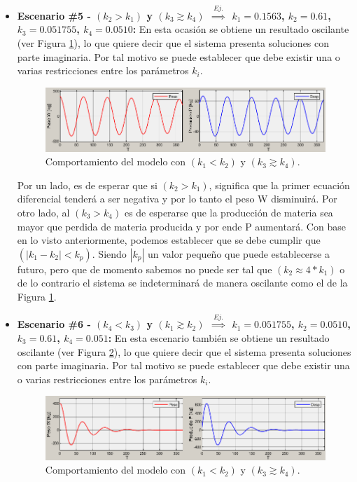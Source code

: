 \begin{itemize}
    \pagebreak
    \item \textbf{Escenario \#5 - $(k_{2} > k_{1})$ y $(k_{3}\gtrsim k_{4})$ $\overset{Ej.}{\implies}$ $k_{1}=0.1563$, $k_{2}=0.61$, $k_{3}=0.051755$, $k_{4}=0.0510$:} En esta ocasión se obtiene un resultado oscilante (ver Figura \ref{k2Mk1_k3MAPk4png}), lo que quiere decir que el sistema presenta soluciones con parte imaginaria. Por tal motivo se puede establecer que debe existir una o varias restricciones entre los parámetros $k_{i}$.
    
        \begin{figure}[H]
            \centering
            \includegraphics[scale=0.75]{img/k2Mk1_k3MAPk4.png}
            \caption{Comportamiento del modelo con $(k_{1}< k_{2})$ y $(k_{3}\gtrsim k_{4})$. \label{k2Mk1_k3MAPk4png}}
        \end{figure}
    
    Por un lado, es de esperar que si $(k_{2} > k_{1})$, significa que la primer ecuación diferencial tenderá a ser negativa y por lo tanto el peso W disminuirá. Por otro lado, al $(k_{3} > k_{4})$ es de esperarse que la producción de materia sea mayor que perdida de materia producida y por ende P aumentará. Con base en lo visto anteriormente, podemos establecer que se debe cumplir que $(|k_{1} - k_{2}| < k_{p})$. Siendo $|k_{p}|$ un valor pequeño que puede establecerse a futuro, pero que de momento sabemos no puede ser tal que $(k_{2} \approx 4*k_{1})$ o de lo contrario el sistema se indeterminará de manera oscilante como el de la Figura \ref{k2Mk1_k3MAPk4png}.
        
    \item \textbf{Escenario \#6 - $(k_{4}< k_{3})$ y $(k_{1}\gtrsim k_{2})$ $\overset{Ej.}{\implies}$ $k_{1}=0.051755$, $k_{2}=0.0510$, $k_{3}=0.61$, $k_{4}=0.051$:} En esta escenario también se obtiene un resultado oscilante (ver Figura \ref{k3Mk4_k1MAPk2png}), lo que quiere decir que el sistema presenta soluciones con parte imaginaria. Por tal motivo se puede establecer que debe existir una o varias restricciones entre los parámetros $k_{i}$.\\

        \begin{figure}[H]
            \centering
            \includegraphics[scale=0.75]{img/k3Mk4_k1MAPk2.png}
            \caption{Comportamiento del modelo con $(k_{1}< k_{2})$ y $(k_{3}\gtrsim k_{4})$. \label{k3Mk4_k1MAPk2png}}
        \end{figure}
    

\end{itemize}

